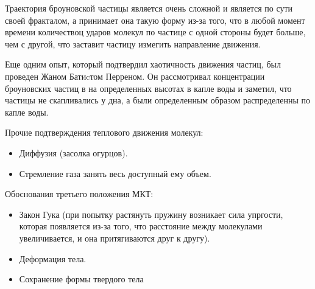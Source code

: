 \documentclass{article}
\begin{document}
\begin{figure}[h]
\end{figure}

Траектория броуновской частицы является очень сложной и является по сути своей фракталом, а принимает она такую форму
из-за того, что в любой момент времени количествоц ударов молекул по частице с одной стороны будет больше, чем с
другой, что заставит частицу измегить направление движения. 

Еще одним опыт, который подтвердил хаотичность движения частиц, был проведен Жаном Батиcтом Перреном. Он рассмотривал
концентрации броуновских частиц в на определенных высотах в капле воды и заметил, что частицы не скапливались у дна,
а были определенным образом распределенны по капле воды. 


\noindent Прочие подтверждения теплового движения молекул:
\begin{itemize}
  \item Диффузия (засолка огурцов). 
  \item Стремление газа занять весь доступный ему объем. 
\end{itemize}

\noindent Обоснования третьего положения МКТ:
\begin{itemize}
  \item Закон Гука (при попытку растянуть пружину возникает сила упргости, которая появляется из-за того, что 
    расстояние между молекулами увеличивается, и она притягиваются друг к другу). 
  \item Деформация тела. 
  \item Сохранение формы твердого тела
\end{itemize}
\end{document}
